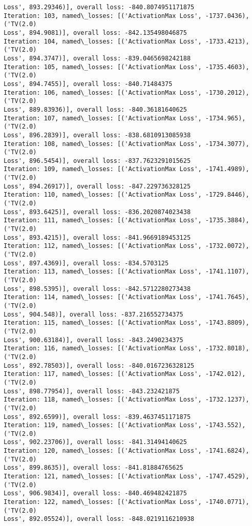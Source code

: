 \documentclass[10pt]{article}
\begin{document}
\begin{Verbatim}[commandchars=\\\{\}]
Loss', 893.29346)], overall loss: -840.8074951171875
Iteration: 103, named\_losses: [('ActivationMax Loss', -1737.0436), ('TV(2.0)
Loss', 894.9081)], overall loss: -842.135498046875
Iteration: 104, named\_losses: [('ActivationMax Loss', -1733.4213), ('TV(2.0)
Loss', 894.3747)], overall loss: -839.0465698242188
Iteration: 105, named\_losses: [('ActivationMax Loss', -1735.4603), ('TV(2.0)
Loss', 894.7455)], overall loss: -840.71484375
Iteration: 106, named\_losses: [('ActivationMax Loss', -1730.2012), ('TV(2.0)
Loss', 889.83936)], overall loss: -840.36181640625
Iteration: 107, named\_losses: [('ActivationMax Loss', -1734.965), ('TV(2.0)
Loss', 896.2839)], overall loss: -838.6810913085938
Iteration: 108, named\_losses: [('ActivationMax Loss', -1734.3077), ('TV(2.0)
Loss', 896.5454)], overall loss: -837.7623291015625
Iteration: 109, named\_losses: [('ActivationMax Loss', -1741.4989), ('TV(2.0)
Loss', 894.26917)], overall loss: -847.229736328125
Iteration: 110, named\_losses: [('ActivationMax Loss', -1729.8446), ('TV(2.0)
Loss', 893.6425)], overall loss: -836.2020874023438
Iteration: 111, named\_losses: [('ActivationMax Loss', -1735.3884), ('TV(2.0)
Loss', 893.4215)], overall loss: -841.9669189453125
Iteration: 112, named\_losses: [('ActivationMax Loss', -1732.0072), ('TV(2.0)
Loss', 897.4369)], overall loss: -834.5703125
Iteration: 113, named\_losses: [('ActivationMax Loss', -1741.1107), ('TV(2.0)
Loss', 898.5395)], overall loss: -842.5712280273438
Iteration: 114, named\_losses: [('ActivationMax Loss', -1741.7645), ('TV(2.0)
Loss', 904.548)], overall loss: -837.216552734375
Iteration: 115, named\_losses: [('ActivationMax Loss', -1743.8809), ('TV(2.0)
Loss', 900.63184)], overall loss: -843.2490234375
Iteration: 116, named\_losses: [('ActivationMax Loss', -1732.8018), ('TV(2.0)
Loss', 892.78503)], overall loss: -840.0167236328125
Iteration: 117, named\_losses: [('ActivationMax Loss', -1742.012), ('TV(2.0)
Loss', 898.77954)], overall loss: -843.232421875
Iteration: 118, named\_losses: [('ActivationMax Loss', -1732.1237), ('TV(2.0)
Loss', 892.6599)], overall loss: -839.4637451171875
Iteration: 119, named\_losses: [('ActivationMax Loss', -1743.552), ('TV(2.0)
Loss', 902.23706)], overall loss: -841.31494140625
Iteration: 120, named\_losses: [('ActivationMax Loss', -1741.6824), ('TV(2.0)
Loss', 899.8635)], overall loss: -841.81884765625
Iteration: 121, named\_losses: [('ActivationMax Loss', -1747.4529), ('TV(2.0)
Loss', 906.9834)], overall loss: -840.469482421875
Iteration: 122, named\_losses: [('ActivationMax Loss', -1740.0771), ('TV(2.0)
Loss', 892.05524)], overall loss: -848.0219116210938

\end{Verbatim}
\end{document}
